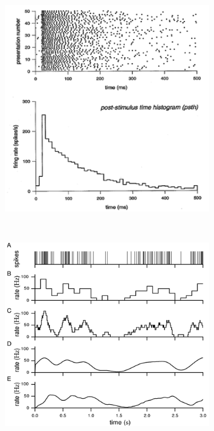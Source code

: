 \documentclass[a4paper, 12pt]{article}
\begin{document}
\begin{figure}[H]
	\centering
	\begin{subfigure}[b]{0.5\textwidth}
		\centering
		\includegraphics[width=\textwidth]{neural-coding-problem.png}
	\end{subfigure}%
	~
	\begin{subfigure}[b]{0.5\textwidth}
		\centering
		\includegraphics[width=\textwidth]{firing-rate.png}
	\end{subfigure}
\end{figure}
\end{document}

